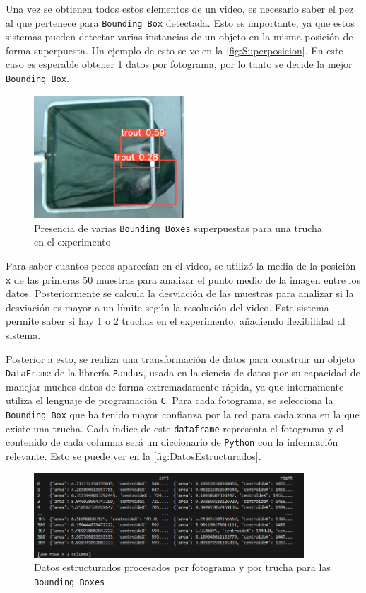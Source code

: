 Una vez se obtienen todos estos elementos de un video, es necesario saber el pez al que pertenece para \texttt{Bounding Box} detectada. Esto es importante, ya que estos sistemas pueden detectar varias instancias de un objeto en la 
misma posición de forma superpuesta. Un ejemplo de esto se ve en la \autoref{fig:Superposicion}. En este caso es esperable obtener 1 datos por fotograma, por lo tanto se decide la mejor \texttt{Bounding Box}.

\begin{figure}[H]
    \centering
    \includegraphics[width=0.5\textwidth]{images/6/6.3/Superposicion.png}
    \caption{Presencia de varias \texttt{Bounding Boxes} superpuestas para una trucha en el experimento}
    \label{fig:Superposicion}
\end{figure}

Para saber cuantos peces aparecían en el video, se utilizó la media de la posición \texttt{x} de las primeras 50 muestras para analizar el punto medio de la imagen entre los datos. 
Posteriormente se calcula la desviación de las muestras para analizar si la desviación es mayor a un límite según la resolución del video. Este sistema permite saber si hay 1 o 2 truchas en el experimento, 
añadiendo flexibilidad al sistema.

Posterior a esto, se realiza una transformación de datos para construir un objeto \texttt{DataFrame} de la librería \texttt{Pandas}, usada en la ciencia de datos por su capacidad de manejar muchos datos de forma 
extremadamente rápida, ya que internamente utiliza el lenguaje de programación \texttt{C}. \newline
Para cada fotograma, se selecciona la \texttt{Bounding Box} que ha tenido mayor confianza por la red para cada zona en la que existe una trucha. Cada índice de este \texttt{dataframe} representa el fotograma y 
el contenido de cada columna será un diccionario de \texttt{Python} con la información relevante. Esto se puede ver en la \autoref{fig:DatosEstructurados}.
\begin{figure}[H]
    \centering
    \includegraphics[width=0.9\textwidth]{images/6/6.3/DatosEstructurados.png}
    \caption{Datos estructurados procesados por fotograma y por trucha para las \texttt{Bounding Boxes}}
    \label{fig:DatosEstructurados}
\end{figure}

